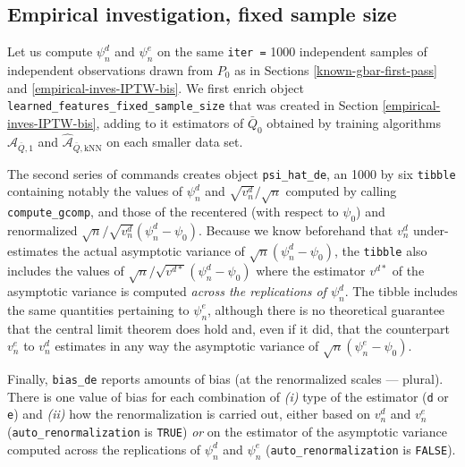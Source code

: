 \documentclass[11pt,openright,twoside]{book}
\newcommand{\Algo}{\widehat{\mathcal{A}}}
\newcommand{\Qbar}{\bar{Q}}
\theoremstyle{definition}
\theoremstyle{definition}
\theoremstyle{definition}
\theoremstyle{remark}
\begin{document}
\hypertarget{empirical-inves-Gcomp}{%
\subsection{Empirical investigation, fixed sample size}\label{empirical-inves-Gcomp}}

Let us compute \(\psi_{n}^{d}\) and \(\psi_{n}^{e}\) on the same \texttt{iter\ =}
1000 independent samples of independent observations drawn from \(P_{0}\) as in
Sections \ref{known-gbar-first-pass} and \ref{empirical-inves-IPTW-bis}. We
first enrich object \texttt{learned\_features\_fixed\_sample\_size} that was created in
Section \ref{empirical-inves-IPTW-bis}, adding to it estimators of
\(\Qbar_{0}\) obtained by training algorithms \(\Algo_{\Qbar,1}\) and
\(\Algo_{\Qbar,\text{kNN}}\) on each smaller data set.

The second series of commands creates object \texttt{psi\_hat\_de}, an 1000 by six
\texttt{tibble} containing notably the values of \(\psi_{n}^{d}\) and
\(\sqrt{v_{n}^{d}}/\sqrt{n}\) computed by calling \texttt{compute\_gcomp}, and those of
the recentered (with respect to \(\psi_{0}\)) and renormalized
\(\sqrt{n}/\sqrt{v_{n}^{d}} (\psi_{n}^{d} - \psi_{0})\). Because we know
beforehand that \(v_{n}^{d}\) under-estimates the actual asymptotic variance of
\(\sqrt{n} (\psi_{n}^{d} - \psi_{0})\), the \texttt{tibble} also includes the values of
\(\sqrt{n}/\sqrt{v^{d*}} (\psi_{n}^{d} - \psi_{0})\) where the estimator
\(v^{d*}\) of the asymptotic variance is computed \emph{across the replications of
\(\psi_{n}^{d}\)}. The tibble includes the same quantities pertaining to
\(\psi_{n}^{e}\), although there is no theoretical guarantee that the central
limit theorem does hold and, even if it did, that the counterpart \(v_{n}^{e}\)
to \(v_{n}^{d}\) estimates in any way the asymptotic variance of \(\sqrt{n} (\psi_{n}^{e} - \psi_{0})\).

Finally, \texttt{bias\_de} reports amounts of bias (at the renormalized scales ---
plural). There is one value of bias for each combination of \emph{(i)} type of the
estimator (\texttt{d} or \texttt{e}) and \emph{(ii)} how the renormalization is carried out,
either based on \(v_{n}^{d}\) and \(v_{n}^{e}\) (\texttt{auto\_renormalization} is \texttt{TRUE})
\emph{or} on the estimator of the asymptotic variance computed across the
replications of \(\psi_{n}^{d}\) and \(\psi_{n}^{e}\) (\texttt{auto\_renormalization} is
\texttt{FALSE}).
\end{document}
